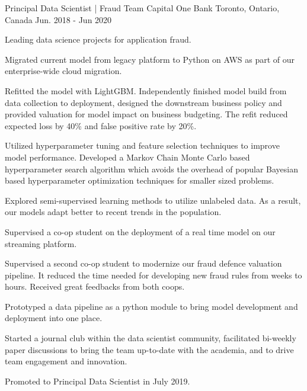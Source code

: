 \begin{cventries}

  \cventry
    {Principal Data Scientist | Fraud Team} %
    {Capital One Bank} %
    {Toronto, Ontario, Canada} %
    {Jun. 2018 - Jun 2020} %
    {
      \begin{cvitems} %
        \item {Leading data science projects for application fraud.}\\
        \begin{cvitems}
          \item {Migrated current model from legacy platform to Python on AWS as part of our enterprise-wide cloud migration.}
          \item {Refitted the model with LightGBM. Independently finished model build from data collection to deployment, designed the downstream business policy and provided valuation for model impact on business budgeting. The refit reduced expected loss by 40\% and false positive rate by 20\%.}
          \item {Utilized hyperparameter tuning and feature selection techniques to improve model performance. Developed a Markov Chain Monte Carlo based hyperparameter search algorithm which avoids the overhead of popular Bayesian based hyperparameter optimization techniques for smaller sized problems.}
          \item {Explored semi-supervised learning methods to utilize unlabeled data. As a result, our models adapt better to recent trends in the population.}
          \item {Supervised a co-op student on the deployment of a real time model on our streaming platform.}
          \item {Supervised a second co-op student to modernize our fraud defence valuation pipeline. It reduced the time needed for developing new fraud rules from weeks to hours. Received great feedbacks from both coops.}
          \item {Prototyped a data pipeline as a python module to bring model development and deployment into one place.}\\
        \end{cvitems}
        \item {Started a journal club within the data scientist community, facilitated bi-weekly paper discussions to bring the team up-to-date with the academia, and to drive team engagement and innovation.}
        \item {Promoted to Principal Data Scientist in July 2019.}
      \end{cvitems}
    }


\end{cventries}
